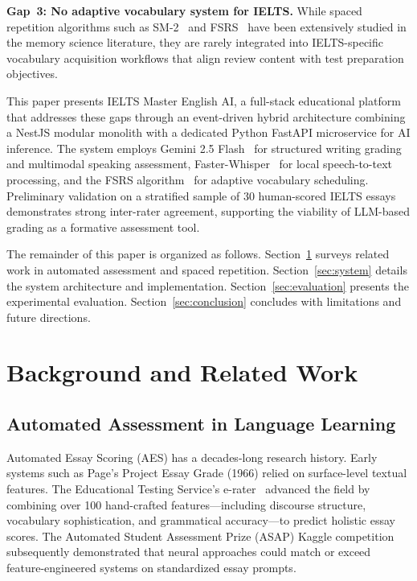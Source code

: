 \documentclass{IEEEtran}
\begin{document}
\textbf{Gap~3: No adaptive vocabulary system for IELTS.} While spaced repetition algorithms such as SM-2~\cite{sm2} and FSRS~\cite{fsrs} have been extensively studied in the memory science literature, they are rarely integrated into IELTS-specific vocabulary acquisition workflows that align review content with test preparation objectives.

This paper presents IELTS Master English AI, a full-stack educational platform that addresses these gaps through an event-driven hybrid architecture combining a NestJS modular monolith with a dedicated Python FastAPI microservice for AI inference. The system employs Gemini 2.5 Flash~\cite{gemini} for structured writing grading and multimodal speaking assessment, Faster-Whisper~\cite{faster_whisper} for local speech-to-text processing, and the FSRS algorithm~\cite{fsrs} for adaptive vocabulary scheduling. Preliminary validation on a stratified sample of 30 human-scored IELTS essays demonstrates strong inter-rater agreement, supporting the viability of LLM-based grading as a formative assessment tool.

The remainder of this paper is organized as follows. Section~\ref{sec:background} surveys related work in automated assessment and spaced repetition. Section~\ref{sec:system} details the system architecture and implementation. Section~\ref{sec:evaluation} presents the experimental evaluation. Section~\ref{sec:conclusion} concludes with limitations and future directions.

\section{Background and Related Work}
\label{sec:background}

\subsection{Automated Assessment in Language Learning}

Automated Essay Scoring (AES) has a decades-long research history. Early systems such as Page's Project Essay Grade (1966) relied on surface-level textual features. The Educational Testing Service's e-rater~\cite{erater} advanced the field by combining over 100 hand-crafted features---including discourse structure, vocabulary sophistication, and grammatical accuracy---to predict holistic essay scores. The Automated Student Assessment Prize (ASAP) Kaggle competition~\cite{asap} subsequently demonstrated that neural approaches could match or exceed feature-engineered systems on standardized essay prompts.
\end{document}
